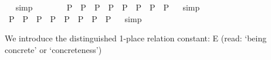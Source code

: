\begin{isabellebody}
\ %
\endisadelimproof
%
\isatagproof
{}\isamarkupfalse%
\ simp%
\endisatagproof
{\isafoldproof}%
%
\isadelimproof
%
\endisadelimproof
\ \isamarkupfalse%
%
\isadelimproof
\ %
\endisadelimproof
%
\isatagproof
{}\isamarkupfalse%
\ %
%
\endisatagproof
{\isafoldproof}%
%
\isadelimproof
%
\endisadelimproof
\isanewline
\isanewline
\ \isamarkupfalse%
\ {\isachardoublequoteopen}{\isacharparenleft}{\isasymphi}\isactrlsup P\ \isactrlbold {\isasymand}\ {\isasympsi}\isactrlsup P\ \isactrlbold {\isasymequiv}\ {\isasymphi}\isactrlsup P\ \isactrlbold {\isasymand}\ {\isasympsi}\isactrlsup P{\isacharparenright}\ {\isasymequiv}\ {\isacharparenleft}{\isacharparenleft}{\isasymphi}\isactrlsup P\ \isactrlbold {\isasymand}\ {\isasympsi}\isactrlsup P{\isacharparenright}\ \isactrlbold {\isasymequiv}\ {\isacharparenleft}{\isasymphi}\isactrlsup P\ \isactrlbold {\isasymand}\ {\isasympsi}\isactrlsup P{\isacharparenright}{\isacharparenright}{\isachardoublequoteclose}%
\isadelimproof
\ %
\endisadelimproof
%
\isatagproof
{}\isamarkupfalse%
\ simp\ \isamarkupfalse%
%
\endisatagproof
{\isafoldproof}%
%
\isadelimproof
%
\endisadelimproof
\isanewline
\ \isamarkupfalse%
\ {\isachardoublequoteopen}{\isacharparenleft}{\isasymphi}\isactrlsup P\ \isactrlbold {\isasymand}\ {\isasympsi}\isactrlsup P\ \isactrlbold {\isasymequiv}\ {\isasymphi}\isactrlsup P\ \isactrlbold {\isasymand}\ {\isasympsi}\isactrlsup P{\isacharparenright}\ {\isasymequiv}\ {\isacharparenleft}{\isasymphi}\isactrlsup P\ \isactrlbold {\isasymand}\ {\isacharparenleft}{\isasympsi}\isactrlsup P\ \isactrlbold {\isasymequiv}\ {\isasymphi}\isactrlsup P{\isacharparenright}\ \isactrlbold {\isasymand}\ {\isasympsi}\isactrlsup P{\isacharparenright}{\isachardoublequoteclose}%
\isadelimproof
\ %
\endisadelimproof
%
\isatagproof
{}\isamarkupfalse%
\ simp%
\endisatagproof
{\isafoldproof}%
%
\isadelimproof
%
\endisadelimproof
\ \isamarkupfalse%
%
\isadelimproof
\ %
\endisadelimproof
%
\isatagproof
{}\isamarkupfalse%
\ %
%
\endisatagproof
{\isafoldproof}%
%
\isadelimproof
%
\endisadelimproof
%
\isamarkuptrue%
%
\begin{isamarkuptext}%
We introduce the distinguished 1-place relation constant: E (read: ‘being concrete’ or ‘concreteness’)%
\end{isamarkuptext}%
\isamarkuptrue%
\ \isamarkupfalse%

\end{isabellebody}

